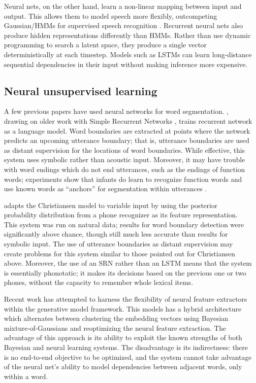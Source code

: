 \documentclass[11pt,letterpaper]{article}
\begin{document}
Neural nets, on the other hand, learn a non-linear mapping between
input and output. This allows them to model speech more flexibly,
outcompeting Gaussian/HMMs for supervised speech recognition
\cite{xxx}. Recurrent neural nets also produce hidden representations
differently than HMMs. Rather than use dynamic programming to search a
latent space, they produce a single vector deterministically at each
timestep. Models such as LSTMs \cite{Schmidhuber} can learn
long-distance sequential dependencies in their input without making
inference more expensive.

\subsection{Neural unsupervised learning}
\label{sub-representations}

A few previous papers have used neural networks for word
segmentation. , drawing on older work with
Simple Recurrent Networks \cite{Elman90}, trains recurrent network as
a language model. Word boundaries are extracted at points where the
network predicts an upcoming utterance boundary; that is, utterance
boundaries are used as distant supervision for the locations of word
boundaries. While effective, this system uses symbolic rather than
acoustic input. Moreover, it may have trouble with word endings which
do not end utterances, such as the endings of function words;
experiments show that infants do learn to recognize function words
\cite{xxx} and use known words as ``anchors'' for segmentation within
utterances \cite{Bortfeld}.

 adapts the Christiansen model to variable input by
using the posterior probability distribution from a phone recognizer
as its feature representation. This system was run on natural data;
results for word boundary detection were significantly above chance,
though still much less accurate than results for symbolic input. The
use of utterance boundaries as distant supervision may create problems
for this system similar to those pointed out for Christiansen
above. Moreover, the use of an SRN rather than an LSTM means that the
system is essentially phonotatic; it makes its decisions based on the
previous one or two phones, without the capacity to remember whole
lexical items.

Recent work \cite{Kamper} has attempted to harness the flexibility of
neural feature extractors within the generative model framework. This
models has a hybrid architecture which alternates between clustering
the embedding vectors using Bayesian mixture-of-Gaussians and
reoptimizing the neural feature extraction. The advantage of this
approach is its ability to exploit the known strengths of both
Bayesian and neural learning systems. The disadvantage is its
indirectness: there is no end-to-end objective to be optimized, and
the system cannot take advantage of the neural net's ability to model
dependencies between adjacent words, only within a word.
\end{document}
